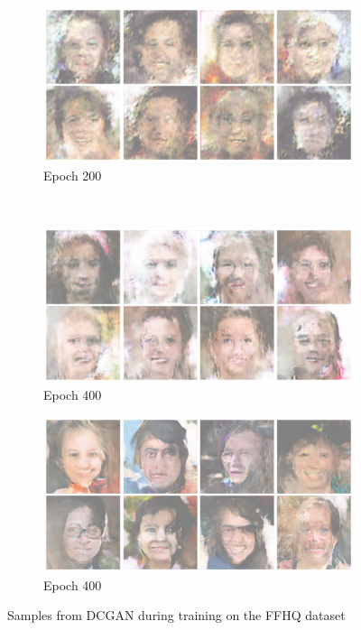 \begin{figure}
    \begin{subfigure}[b]{0.45\textwidth}
        \includegraphics[width=\textwidth]{fig/dcgan/ffhq/epoch2000}
        \caption{Epoch 200}
    \end{subfigure}
    ~
    \begin{subfigure}[b]{0.45\textwidth}
        \includegraphics[width=\textwidth]{fig/dcgan/ffhq/epoch4000}
        \caption{Epoch 400}
    \end{subfigure}

    \begin{subfigure}[b]{\textwidth}
        \includegraphics[width=\textwidth]{fig/dcgan/ffhq/epoch10000}
        \caption{Epoch 400}
    \end{subfigure}
    \caption{Samples from DCGAN during training on the FFHQ dataset}
    \label{dcgan-ffhq-samples}
\end{figure}



